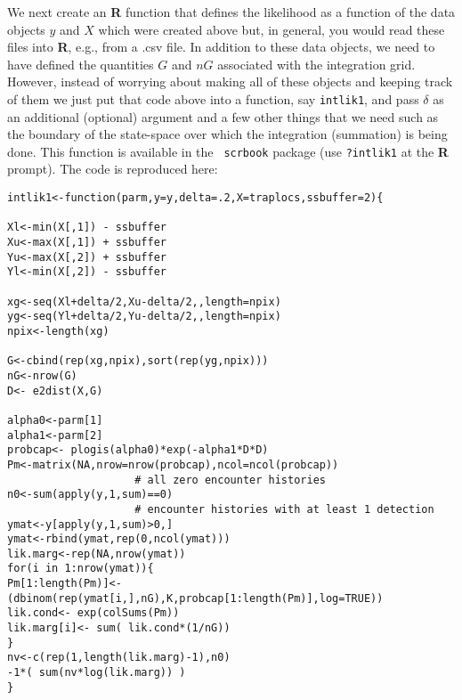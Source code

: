 We next create an {\bf R} function that defines the likelihood as a
function of the data objects $y$ and $X$ which were created above but,
in general, you would read these files into {\bf R}, e.g., from a .csv
file.  In addition to these data objects, we need to have defined the
quantities $G$ and $nG$ associated with the integration grid.
However, instead of worrying about making all of these objects and
keeping track of them we just put that code above into a
function, say \mbox{\tt intlik1}, and pass $\delta$ as an additional
(optional) argument and a few other things that we need such as the
boundary of the state-space over which the integration (summation) is
being done. This function is available in the \mbox{\tt
  scrbook} package (use {\tt ?intlik1} at the {\bf R} prompt).
 The code is reproduced here:

{\small 
\begin{verbatim}
intlik1<-function(parm,y=y,delta=.2,X=traplocs,ssbuffer=2){

Xl<-min(X[,1]) - ssbuffer 
Xu<-max(X[,1]) + ssbuffer
Yu<-max(X[,2]) + ssbuffer
Yl<-min(X[,2]) - ssbuffer

xg<-seq(Xl+delta/2,Xu-delta/2,,length=npix) 
yg<-seq(Yl+delta/2,Yu-delta/2,,length=npix) 
npix<-length(xg)

G<-cbind(rep(xg,npix),sort(rep(yg,npix)))
nG<-nrow(G)
D<- e2dist(X,G)  

alpha0<-parm[1]
alpha1<-parm[2]
probcap<- plogis(alpha0)*exp(-alpha1*D*D)
Pm<-matrix(NA,nrow=nrow(probcap),ncol=ncol(probcap))
                    # all zero encounter histories
n0<-sum(apply(y,1,sum)==0) 
                    # encounter histories with at least 1 detection
ymat<-y[apply(y,1,sum)>0,] 
ymat<-rbind(ymat,rep(0,ncol(ymat)))
lik.marg<-rep(NA,nrow(ymat))
for(i in 1:nrow(ymat)){
Pm[1:length(Pm)]<- (dbinom(rep(ymat[i,],nG),K,probcap[1:length(Pm)],log=TRUE))
lik.cond<- exp(colSums(Pm))
lik.marg[i]<- sum( lik.cond*(1/nG))  
}
nv<-c(rep(1,length(lik.marg)-1),n0)
-1*( sum(nv*log(lik.marg)) )
}
\end{verbatim}
}


